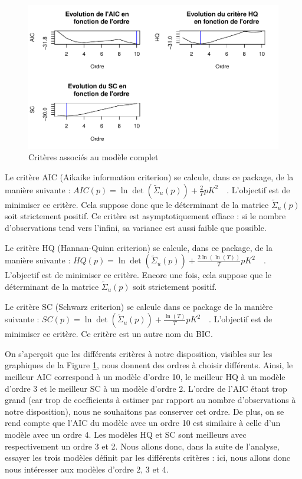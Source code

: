 \documentclass[11pt,]{article}
\begin{document}
\begin{figure}[htbp]
\centering
\includegraphics{Rapport_final_files/figure-latex/unnamed-chunk-25-1.pdf}
\caption{\label{fig20} Critères associés au modèle complet}
\end{figure}

Le critère AIC (Aikaike information criterion) se calcule, dans ce
package, de la manière suivante :
\(AIC(p) = \ln \det(\tilde{\Sigma}_u(p)) + \frac{2}{T}p K^2 \quad\).
L'objectif est de minimiser ce critère. Cela suppose donc que le
déterminant de la matrice \(\tilde{\Sigma}_u(p)\) soit strictement
positif. Ce critère est asymptotiquement effiace : si le nombre
d'observations tend vers l'infini, sa variance est aussi faible que
possible.

Le critère HQ (Hannan-Quinn criterion) se calcule, dans ce package, de
la manière suivante :
\(HQ(p) = \ln \det(\tilde{\Sigma}_u(p)) + \frac{2 \ln(\ln(T))}{T}p K^2 \quad\).
L'objectif est de minimiser ce critère. Encore une fois, cela suppose
que le déterminant de la matrice \(\tilde{\Sigma}_u(p)\) soit
strictement positif.

Le critère SC (Schwarz criterion) se calcule dans ce package de la
manière suivante :
\(SC(p) = \ln \det(\tilde{\Sigma}_u(p)) + \frac{\ln(T)}{T}p K^2 \quad\).
L'objectif est de minimiser ce critère. Ce critère est un autre nom du
BIC.

On s'aperçoit que les différents critères à notre disposition, visibles
sur les graphiques de la Figure \ref{fig20}, nous donnent des ordres à
choisir différents. Ainsi, le meilleur AIC correspond à un modèle
d'ordre 10, le meilleur HQ à un modèle d'ordre 3 et le meilleur SC à un
modèle d'ordre 2. L'ordre de l'AIC étant trop grand (car trop de
coefficients à estimer par rapport au nombre d'observations à notre
disposition), nous ne souhaitons pas conserver cet ordre. De plus, on se
rend compte que l'AIC du modèle avec un ordre 10 est similaire à celle
d'un modèle avec un ordre 4. Les modèles HQ et SC sont meilleurs avec
respectivement un ordre 3 et 2. Nous allons donc, dans la suite de
l'analyse, essayer les trois modèles définit par les différents critères
: ici, nous allons donc nous intéresser aux modèles d'ordre 2, 3 et 4.
\end{document}

